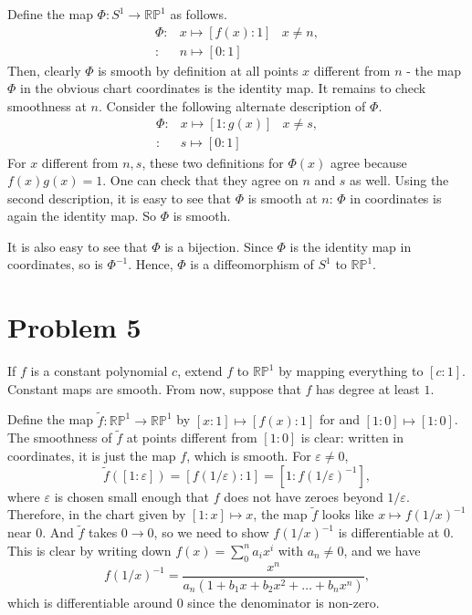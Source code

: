 \documentclass{amsart}
\numberwithin{equation}{section}
\theoremstyle{plain}
\theoremstyle{definition}
\theoremstyle{remark}
\renewcommand{\_}[2]{\underbrace{#1}_{#2}}
\renewcommand{\^}[2]{\overbrace{#1}_{#2}}
\newcommand{\R}{\mathbb{R}}
\renewcommand{\P}{\mathbb{P}}
\begin{document}
Define the map $\Phi: S^1 \to \R\P^1$ as follows.
\begin{align*}
  \Phi: & x \mapsto  [f(x):1] & x \neq n,\\
  : & n \mapsto  [0:1]
\end{align*}
Then, clearly $\Phi$ is smooth by definition at all points $x$ different from $n$ - the map $\Phi$ in the obvious chart coordinates is the identity map. It remains to check smoothness at $n$. Consider the following alternate description of $\Phi$.
\begin{align*}
  \Phi: & x \mapsto  [1:g(x)] & x \neq s, \\
  : & s \mapsto  [0:1]
\end{align*}
For $x$ different from $n,s$, these two definitions for $\Phi(x)$ agree because $f(x) g(x) = 1$. One can check that they agree on $n$ and $s$ as well. Using the second description, it is easy to see that $\Phi$ is smooth at $n$: $\Phi$ in coordinates is again the identity map. So $\Phi$ is smooth.

It is also easy to see that $\Phi$ is a bijection. Since $\Phi$ is the identity map in coordinates, so is $\Phi^{-1}$. Hence, $\Phi$ is a diffeomorphism of $S^1$ to $\R\P^1$.

\section*{Problem 5}
If $f$ is a constant polynomial $c$, extend $f$ to $\R\P^1$ by mapping everything to $[c:1]$. Constant maps are smooth. From now, suppose that $f$ has degree at least $1$.

Define the map $\tilde f: \R\P^1 \to \R\P^1$ by $[x:1] \mapsto [f(x):1]$ for and $[1:0] \mapsto [1:0]$. The smoothness of $\tilde f$ at points different from $[1:0]$ is clear: written in coordinates, it is just the map $f$, which is smooth. For $\varepsilon \neq 0$, $$\tilde f([1:\varepsilon])= [f(1/\varepsilon):1] = [1:f(1/\varepsilon)^{-1}],$$ where $\varepsilon$ is chosen small enough that $f$ does not have zeroes beyond $1/\varepsilon$. Therefore, in the chart given by $[1:x] \mapsto x$, the map $\tilde f$ looks like $x \mapsto f(1/x)^{-1}$ near $0$. And $\tilde f$ takes $0\to 0$, so we need to show $f(1/x)^{-1}$ is differentiable at $0$. This is clear by writing down $f(x) = \sum_0^n a_ix^i$ with $a_n \neq 0$, and we have $$f(1/x)^{-1} = \frac{x^n}{a_n(1 + b_1x + b_2 x^2 + \dots + b_{n}x^{n})},$$ which is differentiable around $0$ since the denominator is non-zero.
\end{document}
